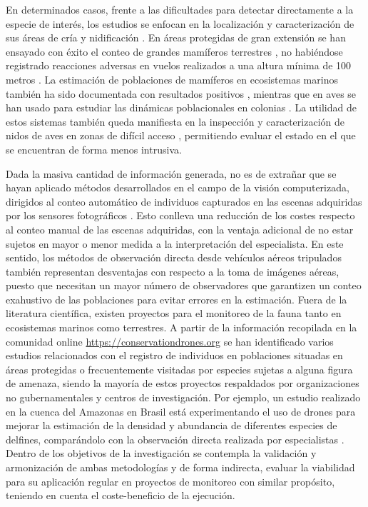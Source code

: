 \documentclass[twocolumn]{extarticle}
\begin{document}
En determinados casos, frente a las dificultades para detectar
directamente a la especie de interés, los estudios se enfocan en la
localización y caracterización de sus áreas de cría y nidificación
\citep{VanAndel2015}. En áreas protegidas de gran extensión se han
ensayado con éxito el conteo de grandes mamíferos terrestres , no
habiéndose registrado reacciones adversas en vuelos realizados a una
altura mínima de 100 metros \citep{Vermeulen2013}. La estimación de
poblaciones de mamíferos en ecosistemas marinos también ha sido
documentada con resultados positivos \citep{Hodgson2013}, mientras que
en aves se han usado para estudiar las dinámicas poblacionales en
colonias \citep{Sarda-Palomera2012}. La utilidad de estos sistemas
también queda manifiesta en la inspección y caracterización de nidos de
aves en zonas de difícil acceso \citep{Weissensteiner2015}, permitiendo
evaluar el estado en el que se encuentran de forma menos intrusiva.

Dada la masiva cantidad de información generada, no es de extrañar que
se hayan aplicado métodos desarrollados en el campo de la visión
computerizada, dirigidos al conteo automático de individuos capturados
en las escenas adquiridas por los sensores fotográficos
\citep{Lhoest2015, Abd-Elrahman2005a, VanGemert2015}. Esto conlleva una
reducción de los costes respecto al conteo manual de las escenas
adquiridas, con la ventaja adicional de no estar sujetos en mayor o
menor medida a la interpretación del especialista. En este sentido, los
métodos de observación directa desde vehículos aéreos tripulados también
representan desventajas con respecto a la toma de imágenes aéreas,
puesto que necesitan un mayor número de observadores que garantizen un
conteo exahustivo de las poblaciones para evitar errores en la
estimación. Fuera de la literatura científica, existen proyectos para el
monitoreo de la fauna tanto en ecosistemas marinos como terrestres. A
partir de la información recopilada en la comunidad online
\url{https://conservationdrones.org} se han identificado varios estudios
relacionados con el registro de individuos en poblaciones situadas en
áreas protegidas o frecuentemente visitadas por especies sujetas a
alguna figura de amenaza, siendo la mayoría de estos proyectos
respaldados por organizaciones no gubernamentales y centros de
investigación. Por ejemplo, un estudio realizado en la cuenca del
Amazonas en Brasil está experimentando el uso de drones para mejorar la
estimación de la densidad y abundancia de diferentes especies de
delfines, comparándolo con la observación directa realizada por
especialistas \citep{WichS2017}. Dentro de los objetivos de la
investigación se contempla la validación y armonización de ambas
metodologías y de forma indirecta, evaluar la viabilidad para su
aplicación regular en proyectos de monitoreo con similar propósito,
teniendo en cuenta el coste-beneficio de la ejecución.
\end{document}
